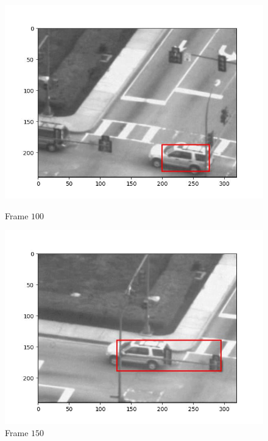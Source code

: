 \begin{figure}[H]
\begin{minipage}{.49\textwidth}
    \includegraphics[width=\textwidth]{./figures/ic_affine/car2/frame000100.jpg}
    \caption{Frame $100$}
  \end{minipage}
  \begin{minipage}{.49\textwidth}
    \centering
    \includegraphics[width=\textwidth]{./figures/ic_affine/car2/frame000150.jpg}
    \caption{Frame $150$}
  \end{minipage}
  \hfill
  \begin{minipage}{.49\textwidth}
    \centering

\end{minipage}
\end{figure}
